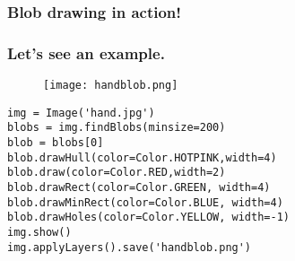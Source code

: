 \documentclass[compress]{beamer}
\begin{document}
\begin{frame}[fragile] 
\frametitle{Blob drawing in action!}
  \frametitle{Let's see an example.}
 \begin{figure}
     \texttt{[image: handblob.png]}
 \end{figure}
\begin{example}
\begin{verbatim}
img = Image('hand.jpg')
blobs = img.findBlobs(minsize=200)
blob = blobs[0]
blob.drawHull(color=Color.HOTPINK,width=4)
blob.draw(color=Color.RED,width=2)
blob.drawRect(color=Color.GREEN, width=4)
blob.drawMinRect(color=Color.BLUE, width=4)
blob.drawHoles(color=Color.YELLOW, width=-1)
img.show()
img.applyLayers().save('handblob.png')
\end{verbatim}
\end{example}
\end{frame}
\end{document}
